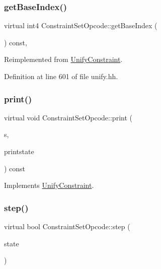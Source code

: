 \subsubsection{\texorpdfstring{getBaseIndex()}{getBaseIndex()}}
{\footnotesize\ttfamily virtual int4 Constraint\+Set\+Opcode\+::get\+Base\+Index (\begin{DoxyParamCaption}\item[{void}]{ }\end{DoxyParamCaption}) const\hspace{0.3cm}{\ttfamily [inline]}, {\ttfamily [virtual]}}



Reimplemented from \mbox{\hyperlink{class_unify_constraint_a44f0164f38ac1fdc44fc73ebe7678de1}{Unify\+Constraint}}.



Definition at line 601 of file unify.\+hh.

\mbox{\label{class_constraint_set_opcode_a460e6a003c470a7272fe89c72e6acfd3}} 
\subsubsection{\texorpdfstring{print()}{print()}}
{\footnotesize\ttfamily virtual void Constraint\+Set\+Opcode\+::print (\begin{DoxyParamCaption}\item[{ostream \&}]{s,  }\item[{\mbox{\hyperlink{class_unify_c_printer}{Unify\+C\+Printer}} \&}]{printstate }\end{DoxyParamCaption}) const\hspace{0.3cm}{\ttfamily [virtual]}}



Implements \mbox{\hyperlink{class_unify_constraint_a774f6a611a96384766cb8e8d8f5ff41f}{Unify\+Constraint}}.

\mbox{\label{class_constraint_set_opcode_a673db34a5b11dc6e004f481d0cccac9e}} 
\subsubsection{\texorpdfstring{step()}{step()}}
{\footnotesize\ttfamily virtual bool Constraint\+Set\+Opcode\+::step (\begin{DoxyParamCaption}\item[{\mbox{\hyperlink{class_unify_state}{Unify\+State}} \&}]{state }\end{DoxyParamCaption})\hspace{0.3cm}{\ttfamily [virtual]}}



